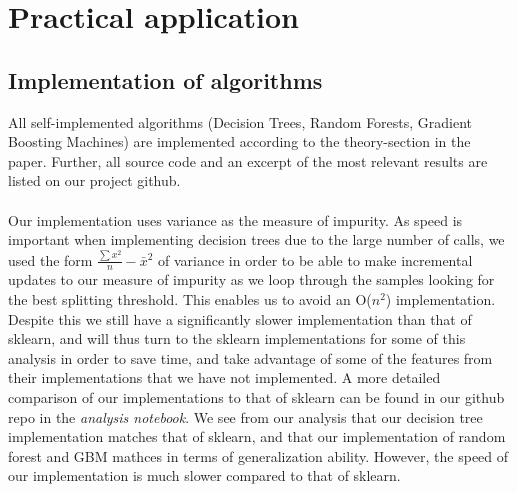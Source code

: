 \documentclass[10pt, a4paper, twocolumn]{article}
\begin{document}
\section{Practical application}
	\subsection{Implementation of algorithms}
		All self-implemented algorithms (Decision Trees, Random Forests, Gradient Boosting Machines) are implemented according to the theory-section in the paper. Further, all source code and an excerpt of the most relevant results are listed on our project github\cite{GithubRepo}.\\\\
		Our implementation uses variance as the measure of impurity. As speed is important when implementing decision trees due to the large number of calls, we used the form $\frac{\sum x^2}{n}-\bar{x}^2$ of variance in order to be able to make incremental updates to our measure of impurity as we loop through the samples looking for the best splitting threshold. This enables us to avoid an O($n^2$) implementation. Despite this we still have a significantly slower implementation than that of sklearn, and will thus turn to the sklearn implementations for some of this analysis in order to save time, and take advantage of some of the features from their implementations that we have not implemented. A more detailed comparison of our implementations to that of sklearn can be found in our github repo in the \emph{analysis notebook}. We see from our analysis that our decision tree implementation matches that of sklearn, and that our implementation of random forest and GBM mathces in terms of generalization ability. However, the speed of our implementation is much slower compared to that of sklearn.
\end{document}
